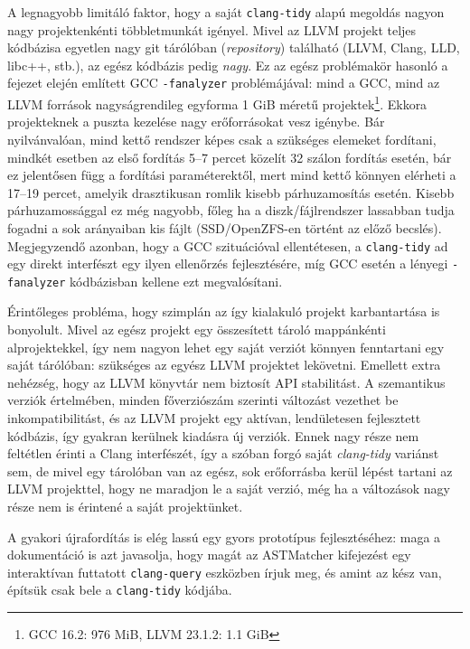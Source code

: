 A legnagyobb limitáló faktor, hogy a saját {\tt clang-tidy} alapú megoldás nagyon nagy projektenkénti többletmunkát igényel.
Mivel az LLVM projekt teljes kódbázisa egyetlen nagy git tárólóban ({\it repository}) található (LLVM, Clang, LLD, libc++, stb.), az egész kódbázis pedig {\sl nagy}.
Ez az egész problémakör hasonló a fejezet elején említett \gls{GCC} {\tt -fanalyzer} problémájával: mind a \gls{GCC}, mind az LLVM források nagyságrendileg egyforma 1 GiB méretű projektek\footnote{GCC 16.2: 976 MiB, LLVM 23.1.2: 1.1 GiB}.
Ekkora projekteknek a puszta kezelése nagy erőforrásokat vesz igénybe.
Bár nyilvánvalóan, mind kettő rendszer képes csak a szükséges elemeket fordítani, mindkét esetben az első fordítás 5--7 percet közelít 32 szálon fordítás esetén, bár ez jelentősen függ a fordítási paraméterektől, mert mind kettő könnyen elérheti a 17--19 percet, amelyik drasztikusan romlik kisebb párhuzamosítás esetén.
Kisebb párhuzamossággal ez még nagyobb, főleg ha a diszk/fájlrendszer lassabban tudja fogadni a sok arányaiban kis fájlt (SSD/OpenZFS-en történt az előző becslés).
Megjegyzendő azonban, hogy a \gls{GCC} szituációval ellentétesen, a {\tt clang-tidy} ad egy direkt interfészt egy ilyen ellenőrzés fejlesztésére, míg \gls{GCC} esetén a lényegi {\tt -fanalyzer} kódbázisban kellene ezt megvalósítani.

Érintőleges probléma, hogy szimplán az így kialakuló projekt karbantartása is bonyolult.
Mivel az egész projekt egy összesített tároló mappánkénti alprojektekkel, így nem nagyon lehet egy saját verziót könnyen fenntartani egy saját tárólóban: szükséges az egyész LLVM projektet lekövetni.
Emellett extra nehézség, hogy az LLVM könyvtár nem biztosít API stabilitást.
A szemantikus verziók értelmében, minden főverziószám szerinti változást vezethet be inkompatibilitást, és az LLVM projekt egy aktívan, lendületesen fejlesztett kódbázis, így gyakran kerülnek kiadásra új verziók.
Ennek nagy része nem feltétlen érinti a Clang interfészét, így a szóban forgó saját {\it clang-tidy} variánst sem, de mivel egy tárolóban van az egész, sok erőforrásba kerül lépést tartani az LLVM projekttel, hogy ne maradjon le a saját verzió, még ha a változások nagy része nem is érintené a saját projektünket.

A gyakori újrafordítás is elég lassú egy gyors prototípus fejlesztéséhez: maga a dokumentáció \cite{llvmprojectGettingInvolvedExtra} is azt javasolja, hogy magát az ASTMatcher kifejezést egy interaktívan futtatott {\tt clang-query} eszközben írjuk meg, és amint az kész van, építsük csak bele a {\tt clang-tidy} kódjába.

